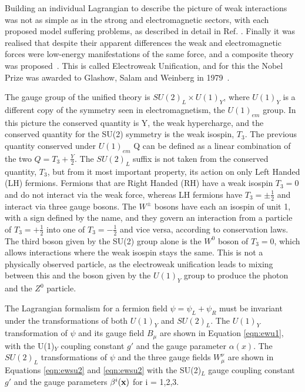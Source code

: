 Building an individual Lagrangian to describe the picture of weak interactions was not as simple as in the strong and electromagnetic sectors, with each proposed model suffering problems, as described in detail in Ref. \cite{HerreroSM}. Finally it was realised that despite their apparent differences the weak and electromagnetic forces were low-energy manifestations of the same force, and a composite theory was proposed~\cite{Glashow}. This is called Electroweak Unification, and for this the Nobel Prize was awarded to Glashow, Salam and Weinberg in 1979~\cite{Breaking}. 

The gauge group of the unified theory is $SU(2)_{L} \times U(1)_{Y}$, where $U(1)_{Y}$ is a different copy of the symmetry seen in electromagnetism, the $U(1)_{em}$ group. In this picture the conserved quantity is Y, the weak hypercharge, and the conserved quantity for the SU(2) symmetry is the weak isospin, $T_{3}$. The previous quantity conserved under $U(1)_{em}$ Q can be defined as a linear combination of the two $Q = T_{3} + \frac{Y}{2}$.  The $SU(2)_{L}$ suffix is not taken from the conserved quantity, $T_{3}$, but from it most important property, its action on only Left Handed (LH) fermions. Fermions that are Right Handed (RH) have a weak isospin $T_{3} = 0$ and do not interact via the weak force, whereas LH fermions have $T_{3} =  \pm \frac{1}{2}$ and interact via three gauge bosons. The $W^{\pm}$ bosons have each an isospin of unit 1, with a sign defined by the name, and they govern an interaction from a particle of $T_{3}=+\frac{1}{2}$ into one of $T_{3}=-\frac{1}{2}$ and vice versa, according to conservation laws. The third boson given by the SU(2) group alone is the $W^{0}$ boson of $T_{3}=0$, which allows interactions where the weak isospin stays the same. This is not a physically observed particle, as the electroweak unification leads to mixing between this and the boson given by the $U(1)_{Y}$ group to produce the photon and the $Z^{0}$ particle.


The Lagrangian formalism for a fermion field $\psi = \psi_{L} + \psi_{R}$ must be invariant under the transformations of both $U(1)_{Y}$ and $SU(2)_{L}$. The $U(1)_{Y}$ transformation of $\psi$ and its gauge field $B_{\mu}$ are shown in Equation \ref{eqn:ewu1}, with the U(1)$_{Y}$ coupling constant $g'$ and the gauge parameter $\alpha(x)$. The $SU(2)_{L}$ transformations of $\psi$ and the three gauge fields $W^{\nu}_{\mu}$ are shown in Equations \ref{eqn:ewsu2} and \ref{eqn:ewsu2} with the SU(2)$_{L}$ gauge coupling constant $g'$ and the gauge parameters $\beta^{i}(\mathbf{x})$ for i = 1,2,3.

